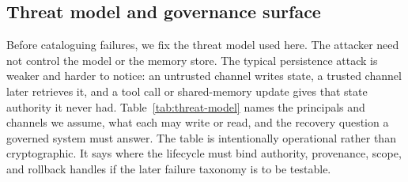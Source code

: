 \subsection{Threat model and governance surface}

Before cataloguing failures, we fix the threat model used here. The attacker need not control the model or the memory store. The typical persistence attack is weaker and harder to notice: an untrusted channel writes state, a trusted channel later retrieves it, and a tool call or shared-memory update gives that state authority it never had. Table~\ref{tab:threat-model} names the principals and channels we assume, what each may write or read, and the recovery question a governed system must answer. The table is intentionally operational rather than cryptographic. It says where the lifecycle must bind authority, provenance, scope, and rollback handles if the later failure taxonomy is to be testable.

